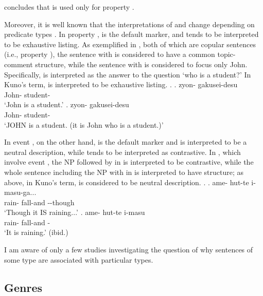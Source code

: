  concludes that
 is used only for property .

Moreover, it is well known that
the interpretations of  and  change
depending on predicate types \cite{kuroda72,kuno73}.
In property ,
 is the default marker, and
 tends to be interpreted to be exhaustive listing.
As exemplified in \Next[a-b], both of which are copular sentences (i.e., property ),
the sentence with  \Next[a] is considered to have a common topic-comment structure,
while the sentence with  \Next[b] is considered to focus only John.
Specifically, \Next[b] is interpreted as the answer to the question `who is a student?'
In Kuno's term,
 is interpreted to be exhaustive listing.
%
\ex.
 \ag. zyon- gakusei-desu \\
      John- student- \\
      `John is a student.'
 \bg. zyon- gakusei-desu \\
      John- student- \\
      `JOHN is a student. (it is John who is a student.)'
      \hfill{\cite[38]{kuno73}}

In event ,
on the other hand,
 is the default marker and is interpreted to be a neutral description,
while  tends to be interpreted as contrastive.
In \Next[a-b], which involve event ,
the NP followed by  in \Next[a] is interpreted to be contrastive,
while the whole sentence including the NP with  in \Next[b] is interpreted to have  structure;
as above, in Kuno's term,
 is considered to be neutral description.
%
\ex.
 \ag. ame- hut-te i-masu-ga... \\
      rain- fall-and --though \\
      `Though it IS raining...'
 \bg. ame- hut-te i-masu \\
      rain- fall-and - \\
      `It is raining.'
      \hfill{(ibid.)}


I am aware of only a few studies investigating the question of
why sentences of some  type are associated with
particular  types.



\subsection{Genres}

